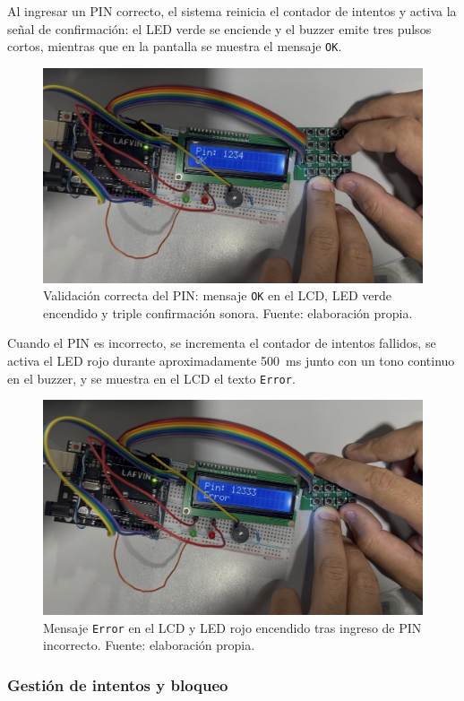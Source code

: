 Al ingresar un PIN correcto, el sistema reinicia el contador de intentos y activa la señal de confirmación: 
el LED verde se enciende y el buzzer emite tres pulsos cortos, mientras que en la pantalla se muestra el mensaje \texttt{OK}.  

\begin{figure}[H]
    \centering
    \includegraphics[width=0.7\columnwidth]{Anexos/Cerradura_OK.png}
    \caption{Validación correcta del PIN: mensaje \texttt{OK} en el LCD, LED verde encendido y triple confirmación sonora. Fuente: elaboración propia.}
    \label{fig:cerradura_ok}
\end{figure}

Cuando el PIN es incorrecto, se incrementa el contador de intentos fallidos, 
se activa el LED rojo durante aproximadamente 500~ms junto con un tono continuo en el buzzer, 
y se muestra en el LCD el texto \texttt{Error}.  

\begin{figure}[H]
    \centering
    \includegraphics[width=0.7\columnwidth]{Anexos/Cerradura_Error.png}
    \caption{Mensaje \texttt{Error} en el LCD y LED rojo encendido tras ingreso de PIN incorrecto. Fuente: elaboración propia.}
    \label{fig:cerradura_error}
\end{figure}

\subsubsection{Gestión de intentos y bloqueo}

